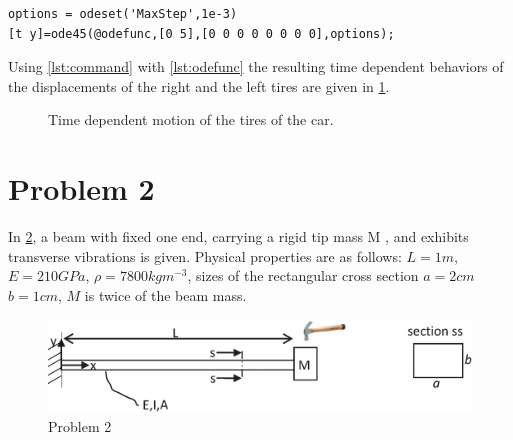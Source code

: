 \documentclass[]{report}
\begin{document}
\begin{lstlisting}[label=lst:command,caption=integration commands]
options = odeset('MaxStep',1e-3)
[t y]=ode45(@odefunc,[0 5],[0 0 0 0 0 0 0 0],options);
\end{lstlisting}
\newpage
\lstset{frame=single,numbers=left}

Using \cref{lst:command} with \cref{lst:odefunc} the resulting time dependent behaviors of the displacements of the right and the left tires are given in \cref{fig:timedependenttires}.
\begin{figure}[ht!]
\centering

\caption{Time dependent motion of the tires of the car.}
\label{fig:timedependenttires}
\end{figure}

\section*{Problem 2}
In \cref{fig:problem2}, a beam  with fixed one end, carrying  a rigid tip mass M , and exhibits transverse vibrations is given. Physical properties are as follows:  $L =1m$, $E=210GPa$, $\rho=7800kgm^{-3}$, sizes of the rectangular cross section $a=2cm$ $b=1cm$, $M$ is twice of the beam mass.
\begin{figure}[ht!]
\centering
\includegraphics[width=\textwidth]{./Figures/2st_Assignment_2}
\caption{Problem 2}
\label{fig:problem2}
\end{figure}
\end{document}

